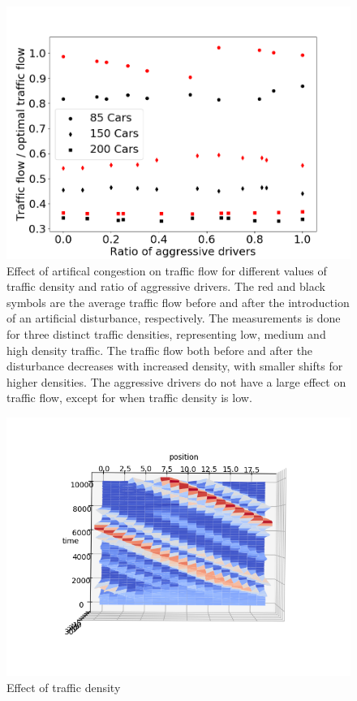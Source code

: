 \documentclass[11pt,a4paper,twocolumn]{article}
\begin{document}
\begin{figure}[ht]     
      \centering
       \includegraphics[scale=0.33]{figs/traffic_density_effect}
       \caption{Effect of artifical congestion on traffic flow for different values of traffic density and ratio of aggressive drivers. The red and black symbols are the average traffic flow before and after the introduction of an artificial disturbance, respectively. The measurements is done for three distinct traffic densities, representing low, medium and high density traffic. The traffic flow both before and after the disturbance decreases with increased density, with smaller shifts for higher densities. The aggressive drivers do not have a large effect on traffic flow, except for when traffic density is low.}
       \label{fig:traffic_density}
 \end{figure}
 
\begin{figure}[t]     
      \centering
       \includegraphics[scale=1, trim={1cm 2.5cm 1cm 3cm}]{figs/phase_transition1.png}
       \caption{Effect of traffic density }
       \label{fig:vel_agg_over_time}
 \end{figure}
\end{document}
